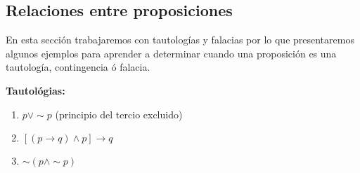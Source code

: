 \subsection{\label{subsec:Relaciones-entre-proposiciones}Relaciones entre proposiciones}

En esta sección trabajaremos con tautologías y falacias por lo que
presentaremos algunos ejemplos para aprender a determinar cuando una
proposición es una tautología, contingencia ó falacia.

\begin{ejemplo}{\bf Tautológias:}
\begin{enumerate}
\item $p\vee\sim p$ (principio del tercio excluido) 
\item $\left[(p\rightarrow q)\wedge p\right]\rightarrow q$
\item $\sim\left(p\wedge\sim p\right)$
\end{enumerate}
\end{ejemplo}

